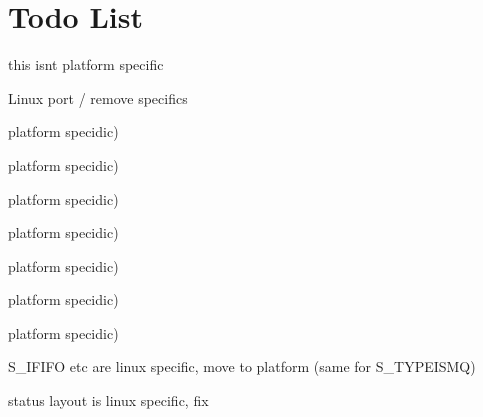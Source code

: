 \chapter{Todo List}
\hypertarget{todo}{}\label{todo}

\begin{DoxyRefList}
\item[Member \doxylink{example_8c_aa006daaf11f1e2e45a6ababaf463212b}{environ} ]\label{todo__todo000001}%
%
this isnt platform specific  
\item[File \doxylink{errno_8h}{errno.h} ]\label{todo__todo000002}%
%
Linux port / remove specifics  
\item[Member \doxylink{in_8h_a4ff6253432e91b991fc9f52243508724}{IPV6\+\_\+\+JOIN\+\_\+\+GROUP} ]\label{todo__todo000003}%
%
platform specidic)  
\item[Member \doxylink{in_8h_a646d950859a748ed739ab6677682ba01}{IPV6\+\_\+\+LEAVE\+\_\+\+GROUP} ]\label{todo__todo000004}%
%
platform specidic)  
\item[Member \doxylink{in_8h_a90164de855aff723de64ac86be51efe6}{IPV6\+\_\+\+MULTICAST\+\_\+\+HOPS} ]\label{todo__todo000005}%
%
platform specidic)  
\item[Member \doxylink{in_8h_afcc32c29ac8987b2ad69411d0384a0e5}{IPV6\+\_\+\+MULTICAST\+\_\+\+IF} ]\label{todo__todo000006}%
%
platform specidic)  
\item[Member \doxylink{in_8h_a2e5d89b45fea8bd9ebc6bb781877adb0}{IPV6\+\_\+\+MULTICAST\+\_\+\+LOOP} ]\label{todo__todo000007}%
%
platform specidic)  
\item[Member \doxylink{in_8h_a4ba4c2d2371787c5302580b03e6ad0c8}{IPV6\+\_\+\+UNICAST\+\_\+\+HOPS} ]\label{todo__todo000008}%
%
platform specidic)  
\item[Member \doxylink{in_8h_a48fb8bf5da186346125c2750265b0c65}{IPV6\+\_\+\+V6\+ONLY} ]\label{todo__todo000009}%
%
platform specidic)  
\item[File \doxylink{stat_8h}{stat.h} ]\label{todo__todo000014}%
%
S\+\_\+\+IFIFO etc are linux specific, move to platform (same for S\+\_\+\+TYPEISMQ)  
\item[File \doxylink{wait_8h}{wait.h} ]\label{todo__todo000015}%
%
status layout is linux specific, fix 
\end{DoxyRefList}